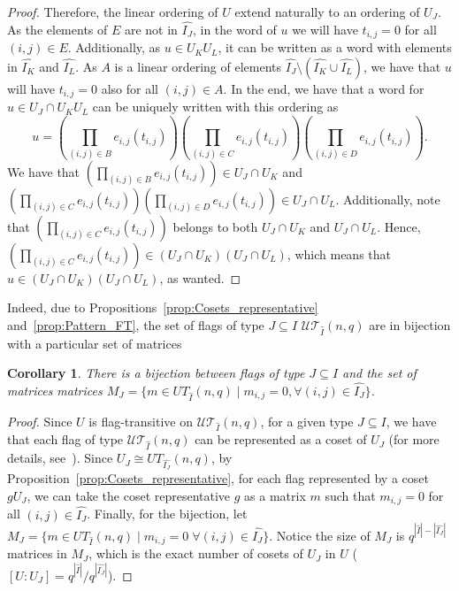 \documentclass[11pt,letterpaper]{amsart}
\newtheorem{coro}[theorem]{Corollary}
\newcommand{\TT}{\mathcal{T}}
\newcommand{\UU}{\mathcal{U}}
\begin{document}
\begin{proof}
    Therefore, the linear ordering of $U$ extend naturally to an ordering of $U_J$.
    As the elements of $E$ are not in $\widehat{I_J}$, in the word of $u$ we will have $t_{i,j}= 0$ for all $(i,j)\in E$.
    Additionally, as $u\in U_K U_L$, it can be written as a word with elements in $\widehat{I_K}$ and $\widehat{I_L}$. As $A$ is a linear ordering of elements $\widehat{I_J}\setminus (\widehat{I_K}\cup \widehat{I_L})$, we have that $u$ will have $t_{i,j}=0$ also for all $(i,j)\in A$.
    In the end, we have that a word for $u\in U_J\cap U_K U_L$ can be uniquely written with this ordering as
    $$ u = \left(\prod_{(i,j)\in B} e_{i,j}(t_{i,j}) \right) \left(\prod_{(i,j)\in C} e_{i,j}(t_{i,j}) \right) \left(\prod_{(i,j)\in D} e_{i,j}(t_{i,j}) \right).$$
    We have that  $\left(\prod_{(i,j)\in B} e_{i,j}(t_{i,j}) \right) \in U_J\cap U_K$ and 
    $\left(\prod_{(i,j)\in C} e_{i,j}(t_{i,j}) \right) \left(\prod_{(i,j)\in D} e_{i,j}(t_{i,j}) \right) \in U_J\cap U_L$. Additionally, note that 
    $\left(\prod_{(i,j)\in C} e_{i,j}(t_{i,j}) \right)$ belongs to both $U_J\cap U_K$ and $U_J\cap U_L$. Hence, $\left(\prod_{(i,j)\in C} e_{i,j}(t_{i,j}) \right) \in (U_J\cap U_K)(U_J\cap U_L)$, which means that  $u\in (U_J\cap U_K)(U_J\cap U_L)$, as wanted.
\end{proof}

Indeed, due to Propositions~\ref{prop:Cosets_representative} and~\ref{prop:Pattern_FT}, the set of flags of type $J\subseteq I$ $\UU\TT_{\widehat{I}}(n,q)$ are in bijection with a particular set of matrices 

\begin{coro}
    There is a bijection between flags of type $J\subseteq I$ and the set of matrices matrices $M_J = \{ m\in UT_{\widehat{I}}(n,q) \mid m_{i,j} = 0, \forall (i,j) \in \widehat{I_J}\}$.
\end{coro}
\begin{proof}
    Since $U$ is flag-transitive on $\UU\TT_{\widehat{I}}(n,q)$, for a given type $J\subseteq I$, we have that each flag of type $\UU\TT_{\widehat{I}}(n,q)$ can be represented as a coset of $U_J$ (for more details, see~\cite[Proposition 2.2]{Piedade2026}). Since $U_J \cong UT_{\widehat{I_J}}(n,q)$, by Proposition~\ref{prop:Cosets_representative}, for each flag represented by a coset $gU_J$, we can take the coset representative $g$ as a matrix $m$ such that $m_{i,j}=0$ for all $(i,j)\in \widehat{I_J}$. Finally, for the bijection, let $M_J = \{ m\in UT_{\widehat{I}}(n,q) \mid m_{i,j} = 0\; \forall (i,j) \in \widehat{I_J}\}$.
    Notice the size of $M_J$ is $q^{|\widehat{I}|-|\widehat{I_J}|}$ matrices in $M_J$, which is the exact number of cosets of $U_J$ in $U$ ($[U :U_J] = q^{|\widehat{I}|}/q^{|\widehat{I_J}|}$).
\end{proof}
\end{document}
